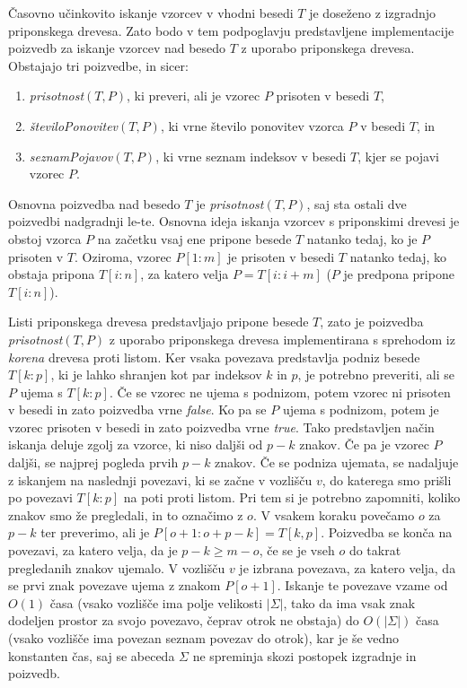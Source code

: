 Časovno učinkovito iskanje vzorcev v vhodni besedi $T$ je doseženo z izgradnjo priponskega drevesa. Zato bodo v tem podpoglavju predstavljene implementacije poizvedb za iskanje vzorcev nad besedo $T$ z uporabo priponskega drevesa. Obstajajo tri poizvedbe, in sicer:
\begin{enumerate}
    \item \textit{prisotnost}$(T,P)$, ki preveri, ali je vzorec $P$ prisoten v besedi $T$,
    \item \textit{številoPonovitev}$(T,P)$, ki vrne število ponovitev vzorca $P$ v besedi $T$, in
    \item \textit{seznamPojavov}$(T,P)$, ki vrne seznam indeksov v besedi $T$, kjer se pojavi vzorec $P$.
\end{enumerate}

Osnovna poizvedba nad besedo $T$ je \textit{prisotnost}$(T,P)$, saj sta ostali dve poizvedbi nadgradnji le-te. Osnovna ideja iskanja vzorcev s priponskimi drevesi je obstoj vzorca $P$ na začetku vsaj ene pripone besede $T$ natanko tedaj, ko je $P$ prisoten v $T$. Oziroma, vzorec $P[1:m]$ je prisoten v besedi $T$ natanko tedaj, ko obstaja pripona $T[i:n]$, za katero velja $P=T[i:i+m]$ ($P$ je predpona pripone $T[i:n]$). 

Listi priponskega drevesa predstavljajo pripone besede $T$, zato je poizvedba \textit{prisotnost}$(T,P)$ z uporabo priponskega drevesa implementirana s sprehodom iz \textit{korena} drevesa proti listom. Ker vsaka povezava predstavlja podniz besede $T[k:p]$, ki je lahko shranjen kot par indeksov $k$ in $p$, je potrebno preveriti, ali se $P$ ujema s $T[k:p]$. Če se vzorec ne ujema s podnizom, potem vzorec ni prisoten v besedi in zato poizvedba vrne \textit{false}. Ko pa se $P$ ujema s podnizom, potem je vzorec prisoten v besedi in zato poizvedba vrne \textit{true}. Tako predstavljen način iskanja deluje zgolj za vzorce, ki niso daljši od $p-k$ znakov. Če pa je vzorec $P$ daljši, se najprej pogleda prvih $p-k$ znakov. Če se podniza ujemata, se nadaljuje z iskanjem na naslednji povezavi, ki se začne v vozlišču $v$, do katerega smo prišli po povezavi $T[k:p]$ na poti proti listom. Pri tem si je potrebno zapomniti, koliko znakov smo že pregledali, in to označimo z $o$. V vsakem koraku povečamo $o$ za $p-k$ ter preverimo, ali je $P[o+1:o+p-k]=T[k,p]$. Poizvedba se konča na povezavi, za katero velja, da je $p-k\ge m-o$, če se je vseh $o$ do takrat pregledanih znakov ujemalo. V vozlišču $v$ je izbrana povezava, za katero velja, da se prvi znak povezave ujema z znakom $P[o+1]$. Iskanje te povezave vzame od $O(1)$ časa (vsako vozlišče ima polje velikosti $|\Sigma|$, tako da ima vsak znak dodeljen prostor za svojo povezavo, čeprav otrok ne obstaja) do $O(|\Sigma|)$ časa (vsako vozlišče ima povezan seznam povezav do otrok), kar je še vedno konstanten čas, saj se abeceda $\Sigma$ ne spreminja skozi postopek izgradnje in poizvedb.

